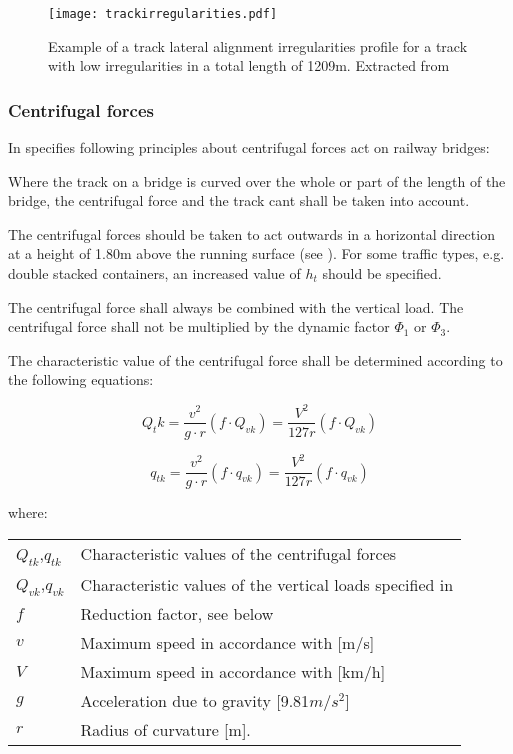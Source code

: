 \begin{figure}[p]
	\centering
	\texttt{[image: trackirregularities.pdf]}
	\caption{Example of a track lateral alignment irregularities profile for a track with low irregularities in a total length of 1209m.  Extracted from \cite{da2007dynamic}}
	\label{fig:trackirrg}
\end{figure}


\subsubsection{Centrifugal forces}
In \cite[6.5.1]{EC12} specifies following principles about centrifugal forces act on railway bridges:

Where the track on a bridge is curved over the whole or part of the length of the bridge, the centrifugal force and the track cant shall be taken into account.

The centrifugal forces should be taken to act outwards in a horizontal direction at a height of 1.80m above the running surface (see \cite[Figure 1.1]{EC12}). For some traffic types, e.g. double stacked containers, an increased value of $h_t$ should be specified.

The centrifugal force shall always be combined with the vertical load. The centrifugal force shall not be multiplied by the dynamic factor $\varPhi_1$ or $\varPhi_3$.

The characteristic value of the centrifugal force shall be determined according to the following equations:

\begin{equation}
	Q_tk=\frac{v^2}{g \cdot r}(f \cdot Q_{vk})=\frac{V^2}{127r}(f \cdot Q_{vk})
\end{equation}

\begin{equation}
	q_{tk}=\frac{v^2}{g \cdot r}(f \cdot q_{vk})=\frac{V^2}{127r}(f \cdot q_{vk})
\end{equation}

where:

\begin{tabular}{ll}
$Q_{tk}$,$q_{tk}$ & Characteristic values of the centrifugal forces\\
$Q_{vk}$,$q_{vk}$ & Characteristic values of the vertical loads specified in \cite[6.3]{EC12}\\
$f$ & Reduction factor, see below \\
$v$ & Maximum speed in accordance with \cite[6.5.1(5)]{EC12}[m/s]\\
$V$ & Maximum speed in accordance with \cite[6.5.1(5)]{EC12}[km/h]\\
$g$ & Acceleration due to gravity [9.81$m/s^2$]\\
$r$ & Radius of curvature [m].
\end{tabular}

